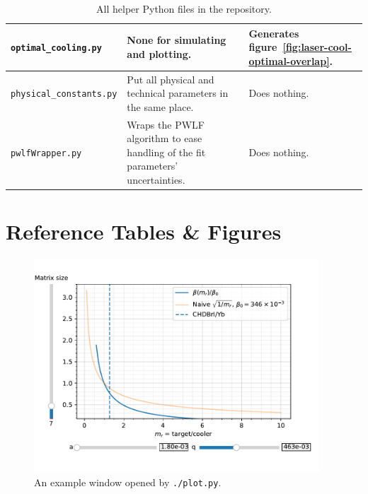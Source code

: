 \begin{table}
\begin{tabularx}{\textwidth}{l|X|X}
\hline
\texttt{optimal\_cooling.py}    & None for simulating and plotting.                                                                                                                      & Generates figure~\ref{fig:laser-cool-optimal-overlap}.                                                                                                                                                                                              \\
\hline
\texttt{physical\_constants.py} & Put all physical and technical parameters in the same place.                                                                                           & Does nothing.                                                                                                                                                                                                                                        \\
\hline
\texttt{pwlfWrapper.py}         & Wraps the PWLF algorithm to ease handling of the fit parameters' uncertainties.                                                                        & Does nothing.
\end{tabularx}
\caption{All helper Python files in the repository.}
\label{tbl:helper-scripts}
\end{table}

\clearpage
\section{Reference Tables \& Figures}



\begin{figure}
	\begin{center}
		\includegraphics[width=0.95\textwidth]{graphics/software-plot-example.pdf}
	\end{center}
	\caption{An example window opened by \texttt{./plot.py}.}
	\label{fig:software-plot-example}
\end{figure}

